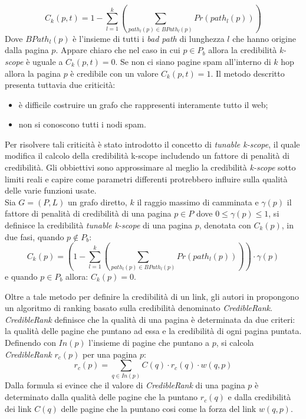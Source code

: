 \begin{equation}
 C_k(p,t)=1-\sum_{l=1}^k\left (\sum_{path_l(p)\in BPath_l(p)}Pr(path_l(p))\right )
\end{equation}
Dove \(BPath_l(p)\) è l'insieme di tutti i \textit{bad path} di lunghezza \(l\) che hanno origine dalla pagina \(p\). Appare chiaro che nel caso in cui \(p\in P_b\) allora la credibilità \textit{k-scope} è uguale a \(C_k(p,t)=0\). Se non ci siano pagine spam all'interno di \(k\) hop  allora la pagina \(p\) è credibile con un valore \(C_k(p,t)=1\). Il metodo descritto presenta tuttavia due criticità:
\begin{itemize}
 \item è difficile costruire un grafo che rappresenti interamente tutto il web;
 \item non si conoscono tutti i nodi spam.
\end{itemize}
 Per risolvere tali criticità è stato introdotto il concetto di \textit{tunable k-scope},  il quale modifica il calcolo della credibilità k-scope includendo un fattore di penalità di credibilità. Gli obbiettivi sono approssimare al meglio la credibilità \textit{k-scope} sotto limiti reali e capire come parametri differenti protrebbero influire sulla qualità delle varie funzioni usate. \\Sia \(G=(P,L)\) un grafo diretto, \(k\) il raggio massimo di camminata e \(\gamma(p)\) il fattore di penalità di credibilità di una pagina \(p\in P\) dove \(0\leq \gamma(p)\leq 1\), si definisce la credibilità \textit{tunable k-scope} di una pagina \(p\), denotata con \(C_k(p)\), in due fasi, quando \(p \not \in P_b\):
\begin{equation} 
C_k(p)=\left ( 1 -\sum_{l=1}^k \left ( \sum_{path_l(p)\in BPath_l(p)} Pr(path_l(p)) \right ) \right ) \cdot\gamma(p)
\end{equation}
e quando \(p\in P_b\) allora: \(C_k(p)=0\).

Oltre a tale metodo per definire la credibilità di un link, gli autori in \cite{Caverlee:2007:CWS:1281100.1281124} propongono un algoritmo di ranking  basato sulla credibilità denominato \textit{CredibleRank}. \textit{CredibleRank} definisce che la qualità di una pagina è determinata da due criteri: la qualità delle pagine che puntano ad essa e la credibilità di ogni pagina puntata. Definendo con \(In(p)\) l'insieme di pagine che puntano a \(p\), si calcola \textit{CredibleRank} \(r_c(p)\) per una pagina \(p\):
\begin{equation}
r_c(p)=\sum_{q\in In(p)}C(q)\cdot r_c(q)\cdot w(q,p)
\end{equation}
Dalla formula si evince che il valore di \textit{CredibleRank} di una pagina \(p\) è determinato dalla qualità delle pagine che la puntano \(r_c(q)\) e dalla credibilità dei link \(C(q)\) delle pagine che la puntano cosi come la forza del link \(w(q,p)\).

